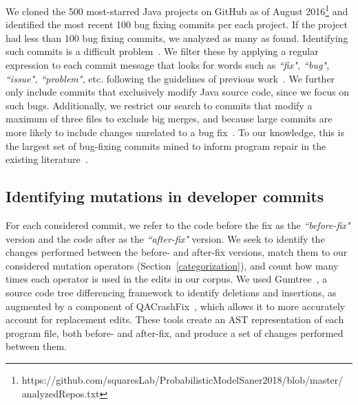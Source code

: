 \documentclass[conference]{IEEEtran}
\begin{document}
We cloned the 500 most-starred Java projects on GitHub 
as of August 2016\footnote{https://github.com/squaresLab/ProbabilisticModelSaner2018/blob/master/\\analyzedRepos.txt} and
identified the most recent 100 bug fixing commits per each project. If 
the project had less than 100 bug fixing commits, we analyzed as many as found. 
Identifying
such commits is a difficult
problem~\cite{Bird09}. We filter these by applying a
regular expression to each commit message that looks for words such as \emph{``fix", ``bug", ``issue", ``problem",}
etc. following the guidelines of previous work~\cite{schroter06}.
%
We further only include commits
that exclusively 
modify Java source code, since we focus on such bugs. Additionally, we restrict our search to commits 
that modify a maximum of three files to exclude
big merges, and because
large commits are more likely to include changes unrelated to a bug fix~\cite{Herzig13,Kawrykow11}.
To our knowledge, this is the largest set of bug-fixing commits mined to inform
program repair in the existing literature~\cite{long16proph,Soto16,zhong15,martinez15,xuan16}. 

\subsection{Identifying mutations in developer commits}
\label{sec:mining}

For each considered commit, we refer to the code before the fix as the
\emph{``before-fix"} version and the code after as the \emph{``after-fix"} version.
We seek to identify the changes performed between the before- and
after-fix versions, match them to our considered mutation operators
(Section~\ref{categorization}), and count how many times each operator is used
in the edits in our corpus. 
We used Gumtree~\cite{falleri14}, a source code tree
differencing framework to identify deletions and insertions, as augmented by a
component of QACrashFix~\cite{gao15}, which allows it to more accurately account for
replacement edits. 
These tools create an AST representation of each program file, both before- and after-fix, and produce a set of 
changes performed between them. 
\end{document}
